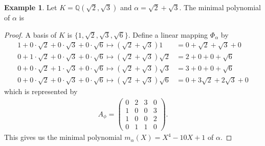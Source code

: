 \documentclass[a4paper]{book}
\theoremstyle{definition}
\newtheorem{example}{Example}[definition]
\begin{document}
\begin{example}
    Let \(K = \mathbb{Q}(\sqrt{2}, \sqrt{3})\) and \(\alpha = \sqrt{2}+ \sqrt{3}\). The minimal polynomial of \(\alpha\) is
\end{example}
\begin{proof}
    A basis of \(K\) is \(\{1, \sqrt{2}, \sqrt{3}, \sqrt{6}\}\). Define a linear mapping \(\Phi_\alpha\) by
    \begin{align*}
        1 + 0 \cdot \sqrt{2} + 0 \cdot \sqrt{3} + 0 \cdot \sqrt{6} \mapsto (\sqrt{2} + \sqrt{3}) 1 &= 0 + \sqrt{2} + \sqrt{3} + 0 \\
        0 + 1 \cdot \sqrt{2} + 0 \cdot \sqrt{3} + 0 \cdot \sqrt{6} \mapsto (\sqrt{2} + \sqrt{3}) \sqrt{2} &= 2 + 0 + 0 + \sqrt{6} \\
        0 + 0 \cdot \sqrt{2} + 1 \cdot \sqrt{3} + 0 \cdot \sqrt{6} \mapsto (\sqrt{2} + \sqrt{3}) \sqrt{3} &= 3 + 0 + 0 + \sqrt{6} \\
        0 + 0 \cdot \sqrt{2} + 0 \cdot \sqrt{3} + 0 \cdot \sqrt{6} \mapsto (\sqrt{2} + \sqrt{3}) \sqrt{6} &= 0 + 3 \sqrt{2} + 2 \sqrt{3} + 0
    \end{align*}
    which is represented by
    \begin{align*}
        A_\phi = \begin{pmatrix}
            0 & 2 & 3 & 0 \\
            1 & 0 & 0 & 3 \\
            1 & 0 & 0 & 2 \\
            0 & 1 & 1 & 0
        \end{pmatrix} \text{.}
    \end{align*}
    This gives us the minimal polynomial \(m_\alpha(X) = X^4 - 10 X + 1\) of \(\alpha\).
\end{proof}
\end{document}
